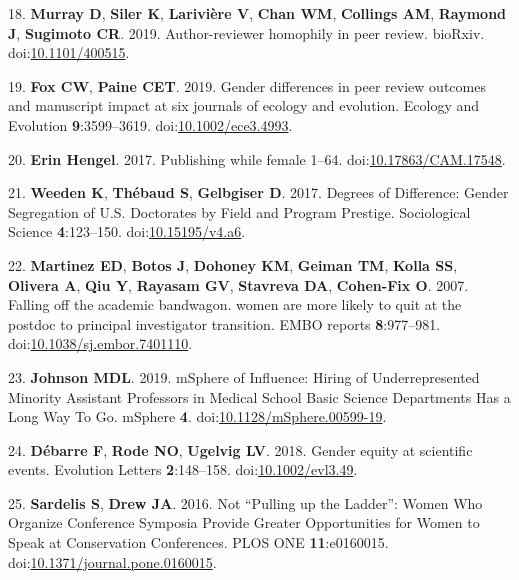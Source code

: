 \documentclass[11pt,]{article}
\begin{document}
\hypertarget{ref-Murray400515}{}
18. \textbf{Murray D}, \textbf{Siler K}, \textbf{Larivière V},
\textbf{Chan WM}, \textbf{Collings AM}, \textbf{Raymond J},
\textbf{Sugimoto CR}. 2019. Author-reviewer homophily in peer review.
bioRxiv. doi:\href{https://doi.org/10.1101/400515}{10.1101/400515}.

\hypertarget{ref-fox_gender_2019}{}
19. \textbf{Fox CW}, \textbf{Paine CET}. 2019. Gender differences in
peer review outcomes and manuscript impact at six journals of ecology
and evolution. Ecology and Evolution \textbf{9}:3599--3619.
doi:\href{https://doi.org/10.1002/ece3.4993}{10.1002/ece3.4993}.

\hypertarget{ref-erin_hengel_publishing_2017}{}
20. \textbf{Erin Hengel}. 2017. Publishing while female 1--64.
doi:\href{https://doi.org/10.17863/CAM.17548}{10.17863/CAM.17548}.

\hypertarget{ref-weeden_degrees_2017}{}
21. \textbf{Weeden K}, \textbf{Thébaud S}, \textbf{Gelbgiser D}. 2017.
Degrees of Difference: Gender Segregation of U.S. Doctorates by Field
and Program Prestige. Sociological Science \textbf{4}:123--150.
doi:\href{https://doi.org/10.15195/v4.a6}{10.15195/v4.a6}.

\hypertarget{ref-Martinez2007}{}
22. \textbf{Martinez ED}, \textbf{Botos J}, \textbf{Dohoney KM},
\textbf{Geiman TM}, \textbf{Kolla SS}, \textbf{Olivera A}, \textbf{Qiu
Y}, \textbf{Rayasam GV}, \textbf{Stavreva DA}, \textbf{Cohen-Fix O}.
2007. Falling off the academic bandwagon. women are more likely to quit
at the postdoc to principal investigator transition. EMBO reports
\textbf{8}:977--981.
doi:\href{https://doi.org/10.1038/sj.embor.7401110}{10.1038/sj.embor.7401110}.

\hypertarget{ref-johnson_msphere_2019}{}
23. \textbf{Johnson MDL}. 2019. mSphere of Influence: Hiring of
Underrepresented Minority Assistant Professors in Medical School Basic
Science Departments Has a Long Way To Go. mSphere \textbf{4}.
doi:\href{https://doi.org/10.1128/mSphere.00599-19}{10.1128/mSphere.00599-19}.

\hypertarget{ref-debarre_gender_2018}{}
24. \textbf{Débarre F}, \textbf{Rode NO}, \textbf{Ugelvig LV}. 2018.
Gender equity at scientific events. Evolution Letters
\textbf{2}:148--158.
doi:\href{https://doi.org/10.1002/evl3.49}{10.1002/evl3.49}.

\hypertarget{ref-sardelis_not_2016}{}
25. \textbf{Sardelis S}, \textbf{Drew JA}. 2016. Not ``Pulling up the
Ladder'': Women Who Organize Conference Symposia Provide Greater
Opportunities for Women to Speak at Conservation Conferences. PLOS ONE
\textbf{11}:e0160015.
doi:\href{https://doi.org/10.1371/journal.pone.0160015}{10.1371/journal.pone.0160015}.
\end{document}
